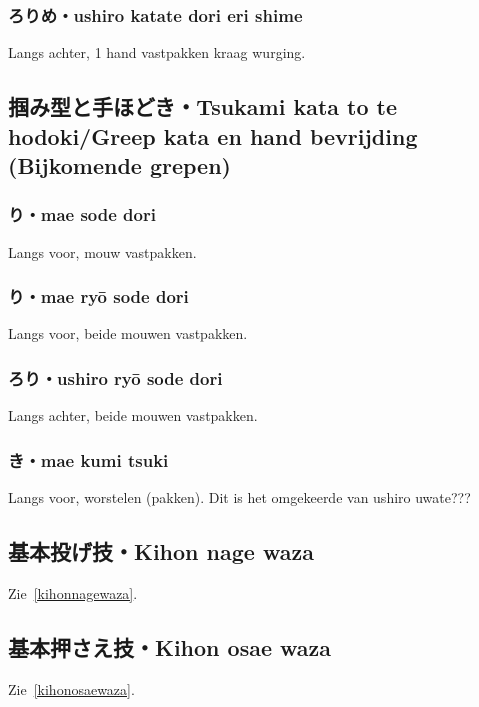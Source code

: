 \subsubsection{ろりめ・ushiro katate dori eri shime}
Langs achter, 1 hand vastpakken kraag wurging.

\subsection{掴み型と手ほどき・Tsukami kata to te hodoki/Greep kata en hand bevrijding (Bijkomende grepen)}
\subsubsection{り・mae sode dori}
Langs voor, mouw vastpakken.

\subsubsection{り・mae ry\={o} sode dori}
Langs voor, beide mouwen vastpakken.

\subsubsection{ろり・ushiro ry\={o} sode dori}
Langs achter, beide mouwen vastpakken.

\subsubsection{き・mae kumi tsuki}
Langs voor, worstelen (pakken). Dit is het omgekeerde van ushiro uwate???

\subsection{基本投げ技・Kihon nage waza}
Zie~\ref{kihonnagewaza}.

\subsection{基本押さえ技・Kihon osae waza}
Zie~\ref{kihonosaewaza}.

